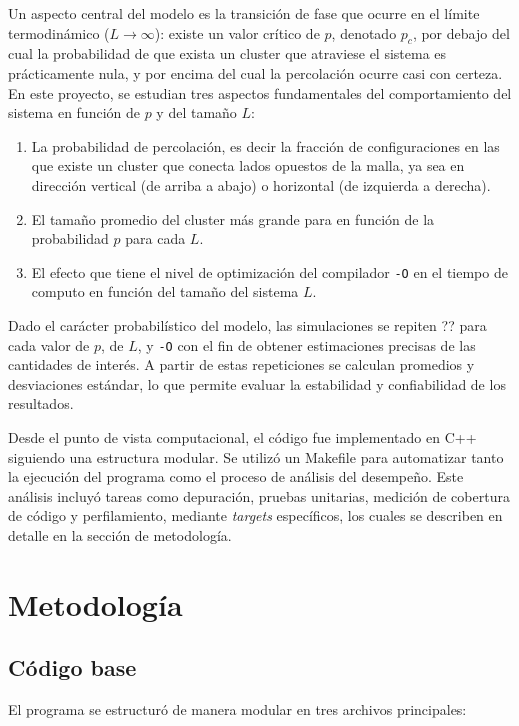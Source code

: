 \documentclass[%
 reprint,
 amsmath,amssymb,
 aps,
]{revtex4-2}
\begin{document}
Un aspecto central del modelo es la transición de fase que ocurre en el límite termodinámico ($L \to \infty$): existe un valor crítico de $p$, denotado $p_c$, por debajo del cual la probabilidad de que exista un cluster que atraviese el sistema es prácticamente nula, y por encima del cual la percolación ocurre casi con certeza. En este proyecto, se estudian tres aspectos fundamentales del comportamiento del sistema en función de $p$ y del tamaño $L$:

\begin{enumerate}
    \item La probabilidad de percolación, es decir la fracción de configuraciones en las que existe un cluster que conecta lados opuestos de la malla, ya sea en dirección vertical (de arriba a abajo) o horizontal (de izquierda a derecha).
    \item El tamaño promedio del cluster más grande para en función de la probabilidad $p$ para cada $L$.
    \item El efecto que tiene el nivel de optimización del compilador \texttt{-O} en el tiempo de computo en función del tamaño del sistema $L$.
\end{enumerate}

Dado el carácter probabilístico del modelo, las simulaciones se repiten ?? para cada valor de $p$, de $L$, y \texttt{-O} con el fin de obtener estimaciones precisas de las cantidades de interés. A partir de estas repeticiones se calculan promedios y desviaciones estándar, lo que permite evaluar la estabilidad y confiabilidad de los resultados.

Desde el punto de vista computacional, el código fue implementado en C++ siguiendo una estructura modular. Se utilizó un Makefile para automatizar tanto la ejecución del programa como el proceso de análisis del desempeño. Este análisis incluyó tareas como depuración, pruebas unitarias, medición de cobertura de código y perfilamiento, mediante \textit{targets} específicos, los cuales se describen en detalle en la sección de metodología.

\section{Metodología}

\subsection{Código base}

El programa se estructuró de manera modular en tres archivos principales:
\end{document}
